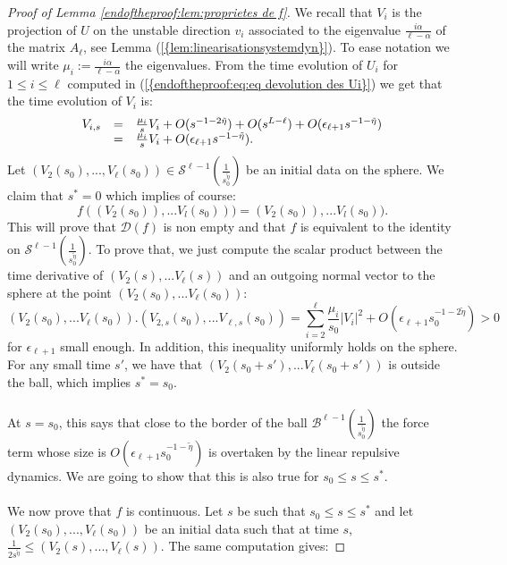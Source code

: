 \documentclass[11pt,a4paper,reqno]{amsart}
\theoremstyle{remark}
\numberwithin{equation}{section}
\begin{document}
\begin{proof}[Proof of Lemma \ref{endoftheproof:lem:proprietes de f}]
We recall that $V_i$ is the projection of $U$ on the unstable direction $v_i$ associated to the eigenvalue $\frac{i\alpha}{\ell-\alpha}$ of the matrix $A_{\ell}$, see Lemma {{\rm (\ref{{lem:linearisationsystemdyn}})}}. To ease notation we will write $\mu_i:=\frac{i\alpha}{\ell-\alpha}$ the eigenvalues. From the time evolution of $U_i$ for $1\leq i \leq \ell$ computed in {{\rm (\ref{{endoftheproof:eq:eq devolution des Ui}})}} we get that the time evolution of $V_i$ is:
$$
\begin{array}{r c l}
V_{i,s}&=&\frac{\mu_i}{s}V_i +O(s^{-1-2\tilde{\eta}})+O(s^{L-\ell})+O(\epsilon_{\ell +1}s^{-1-\tilde{\eta}})\\
&=& \frac{\mu_i}{s}V_i +O(\epsilon_{\ell +1}s^{-1-\tilde{\eta}}) .
\end{array}
$$
Let $(V_2(s_0),...,V_{\ell}(s_0))\in \mathcal{S}^{\ell-1}\left(\frac{1}{s_0^{\tilde{\eta}}} \right)$ be an initial data on the sphere. We claim that $s^*=0$ which implies of course:
$$
f((V_2(s_0)),...V_l(s_0)))=(V_2(s_0)),...V_l(s_0)) .
$$
This will prove that $\mathcal{D}(f)$ is non empty and that $f$ is equivalent to the identity on $\mathcal{S}^{\ell-1}\left(\frac{1}{s_0^{\tilde{\eta}}} \right)$. To prove that, we just compute the scalar product between the time derivative of $(V_2(s),...V_{\ell}(s))$ and an outgoing normal vector to the sphere at the point $(V_2(s_0),...V_{\ell}(s_0))$:
$$
(V_2(s_0),...V_{\ell}(s_0)).(V_{2,s}(s_0),...V_{\ell,s}(s_0)) =\sum_{i=2}^{\ell} \frac{\mu_i}{s_0}|V_i|^2 +O(\epsilon_{\ell+1}s_0^{-1-2\tilde{\eta}})>0
$$
for $\epsilon_{\ell+1}$ small enough. In addition, this inequality uniformly holds on the sphere. For any small time $s'$, we have that $(V_2(s_0+s'),...V_{\ell}(s_0+s'))$ is outside the ball, which implies $s^*=s_0$.\\
\\
At $s=s_0$, this says that close to the border of the ball $\mathcal{B}^{\ell-1}(\frac{1}{s_0^{\tilde{\eta}}})$ the force term whose size is $O(\epsilon_{\ell+1}s_0^{-1-\tilde{\eta}})$ is overtaken by the linear repulsive dynamics. We are going to show that this is also true for $s_0\leq s \leq s^* $.\\
\\
We now prove that $f$ is continuous. Let $s$ be such that $s_0\leq s\leq s^*$ and let $(V_2(s_0),...,V_{\ell}(s_0))$ be an initial data such that at time $s$, $\frac{1}{2s^{\tilde{\eta}}}\leq(V_2(s),...,V_{\ell}(s))$. The same computation gives:

\end{proof}
\end{document}
